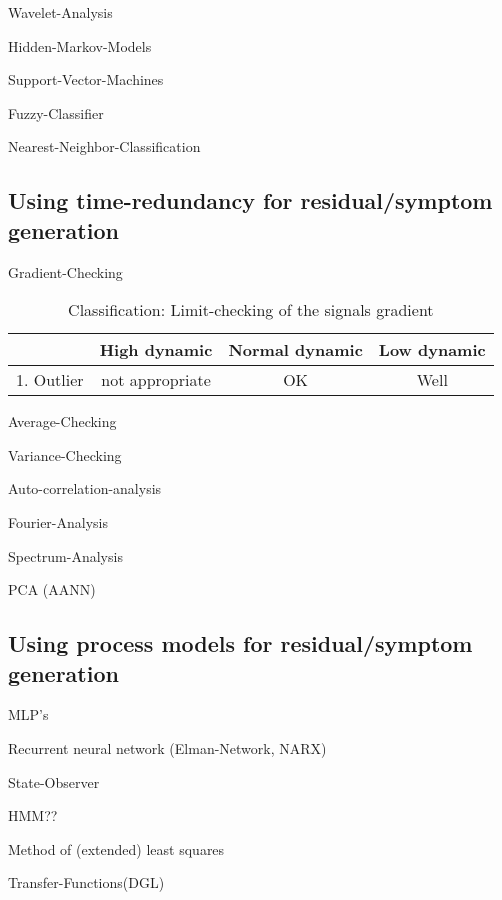 \documentclass[a4paper,11pt]{article}
\begin{document}
Wavelet-Analysis

Hidden-Markov-Models

Support-Vector-Machines

Fuzzy-Classifier

Nearest-Neighbor-Classification 


\subsection{Using time-redundancy for residual/symptom generation}

Gradient-Checking

 \begin{table}[h]
 \caption{Classification: \glqq Limit-checking of the signals gradient \grqq}
 \begin{tabular}{c|c|c|c}
                    & High dynamic        & Normal dynamic        & Low dynamic \\  \hline
 1. Outlier         & not appropriate     &      OK               &       Well
 \end{tabular}
 \label{tab:lc_gradient}
 \end{table}

Average-Checking

Variance-Checking

Auto-correlation-analysis

Fourier-Analysis

Spectrum-Analysis

PCA (AANN)


\subsection{Using process models for residual/symptom generation}
  
MLP's

Recurrent neural network (Elman-Network, NARX)

State-Observer

HMM??

Method of (extended) least squares

Transfer-Functions(DGL)
\end{document}
